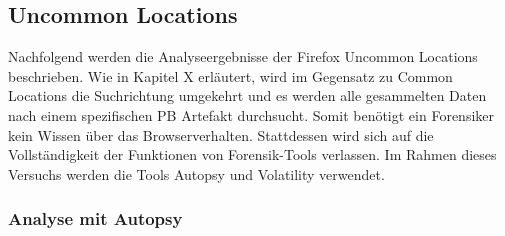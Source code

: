 
\subsection*{Uncommon Locations}

Nachfolgend werden die Analyseergebnisse der Firefox Uncommon Locations beschrieben.
Wie in Kapitel X erläutert, wird im Gegensatz zu Common Locations die Suchrichtung umgekehrt und es werden alle gesammelten Daten nach einem spezifischen PB Artefakt durchsucht.
Somit benötigt ein Forensiker kein Wissen über das Browserverhalten. Stattdessen wird sich auf die Vollständigkeit der Funktionen von Forensik-Tools verlassen. Im Rahmen dieses Versuchs werden die Tools Autopsy und Volatility verwendet.

\subsubsection*{Analyse mit Autopsy}

